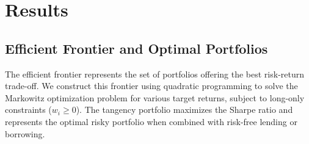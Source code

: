 \documentclass[a4paper, 11pt]{article}
\begin{document}
\section{Results}

\subsection{Efficient Frontier and Optimal Portfolios}

The efficient frontier represents the set of portfolios offering the best risk-return trade-off.
We construct this frontier using quadratic programming to solve the Markowitz optimization
problem for various target returns, subject to long-only constraints ($w_i \geq 0$). The
tangency portfolio maximizes the Sharpe ratio and represents the optimal risky portfolio
when combined with risk-free lending or borrowing.
\end{document}
